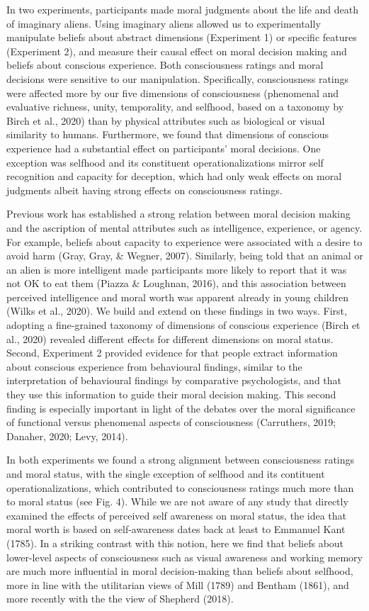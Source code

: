 \documentclass[10pt, letterpaper]{article}
\begin{document}
In two experiments, participants made moral judgments about the life and
death of imaginary aliens. Using imaginary aliens allowed us to
experimentally manipulate beliefs about abstract dimensions (Experiment
1) or specific features (Experiment 2), and measure their causal effect
on moral decision making and beliefs about conscious experience. Both
consciousness ratings and moral decisions were sensitive to our
manipulation. Specifically, consciousness ratings were affected more by
our five dimensions of consciousness (phenomenal and evaluative
richness, unity, temporality, and selfhood, based on a taxonomy by Birch
et al., 2020) than by physical attributes such as biological or visual
similarity to humans. Furthermore, we found that dimensions of conscious
experience had a substantial effect on participants' moral decisions.
One exception was selfhood and its constituent operationalizations
mirror self recognition and capacity for deception, which had only weak
effects on moral judgments albeit having strong effects on consciousness
ratings.

Previous work has established a strong relation between moral decision
making and the ascription of mental attributes such as intelligence,
experience, or agency. For example, beliefs about capacity to experience
were associated with a desire to avoid harm (Gray, Gray, \& Wegner,
2007). Similarly, being told that an animal or an alien is more
intelligent made participants more likely to report that it was not OK
to eat them (Piazza \& Loughnan, 2016), and this association between
perceived intelligence and moral worth was apparent already in young
children (Wilks et al., 2020). We build and extend on these findings in
two ways. First, adopting a fine-grained taxonomy of dimensions of
conscious experience (Birch et al., 2020) revealed different effects for
different dimensions on moral status. Second, Experiment 2 provided
evidence for that people extract information about conscious experience
from behavioural findings, similar to the interpretation of behavioural
findings by comparative psychologists, and that they use this
information to guide their moral decision making. This second finding is
especially important in light of the debates over the moral significance
of functional versus phenomenal aspects of consciousness (Carruthers,
2019; Danaher, 2020; Levy, 2014).

In both experiments we found a strong alignment between consciousness
ratings and moral status, with the single exception of selfhood and its
contituent operationalizations, which contributed to consciousness
ratings much more than to moral status (see Fig. 4). While we are not
aware of any study that directly examined the effects of perceived self
awareness on moral status, the idea that moral worth is based on
self-awareness dates back at least to Emmanuel Kant (1785). In a
striking contrast with this notion, here we find that beliefs about
lower-level aspects of consciousness such as visual awareness and
working memory are much more influential in moral decision-making than
beliefs about selfhood, more in line with the utilitarian views of Mill
(1789) and Bentham (1861), and more recently with the the view of
Shepherd (2018).
\end{document}

